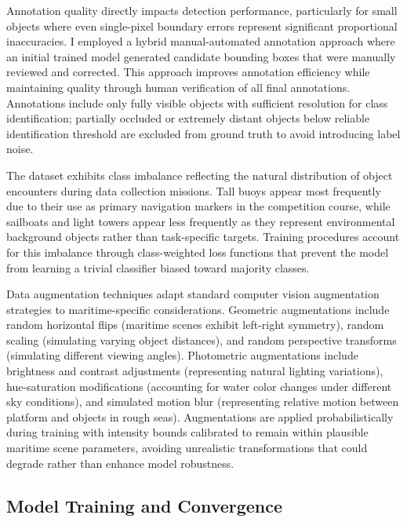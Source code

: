 Annotation quality directly impacts detection performance, particularly for small objects where even single-pixel boundary errors represent significant proportional inaccuracies.
I employed a hybrid manual-automated annotation approach where an initial trained model generated candidate bounding boxes that were manually reviewed and corrected.
This approach improves annotation efficiency while maintaining quality through human verification of all final annotations.
Annotations include only fully visible objects with sufficient resolution for class identification; partially occluded or extremely distant objects below reliable identification threshold are excluded from ground truth to avoid introducing label noise.

The dataset exhibits class imbalance reflecting the natural distribution of object encounters during data collection missions.
Tall buoys appear most frequently due to their use as primary navigation markers in the competition course, while sailboats and light towers appear less frequently as they represent environmental background objects rather than task-specific targets.
Training procedures account for this imbalance through class-weighted loss functions that prevent the model from learning a trivial classifier biased toward majority classes.

Data augmentation techniques adapt standard computer vision augmentation strategies to maritime-specific considerations.
Geometric augmentations include random horizontal flips (maritime scenes exhibit left-right symmetry), random scaling (simulating varying object distances), and random perspective transforms (simulating different viewing angles).
Photometric augmentations include brightness and contrast adjustments (representing natural lighting variations), hue-saturation modifications (accounting for water color changes under different sky conditions), and simulated motion blur (representing relative motion between platform and objects in rough seas).
Augmentations are applied probabilistically during training with intensity bounds calibrated to remain within plausible maritime scene parameters, avoiding unrealistic transformations that could degrade rather than enhance model robustness.

\subsection{Model Training and Convergence} \label{sec:yolo_training convrg}


